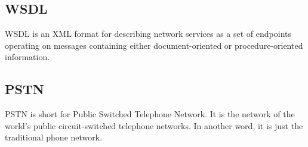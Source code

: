 \subsection*{WSDL}
\label{sec:WSDL}
\label{sym:WSDL}

WSDL is an XML format for describing network services as a set of endpoints operating on messages containing either document-oriented or procedure-oriented information.\cite{WSDL1dot1} 

\subsection*{PSTN}
\label{sym:PSTN} 
\label{sec:PSTN}

PSTN is short for Public Switched Telephone Network. It is the network of the world's public circuit-switched telephone networks. In another word, it is just the traditional phone network.
